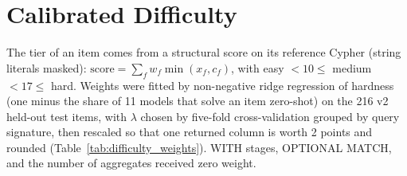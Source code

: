 \section{Calibrated Difficulty}
\label{app:difficulty}
The tier of an item comes from a structural score on its reference Cypher (string literals masked): $\mathrm{score}=\sum_f w_f \min(x_f, c_f)$, with easy $<10\le$ medium $<17\le$ hard. Weights were fitted by non-negative ridge regression of hardness (one minus the share of 11 models that solve an item zero-shot) on the 216 v2 held-out test items, with $\lambda$ chosen by five-fold cross-validation grouped by query signature, then rescaled so that one returned column is worth 2 points and rounded (Table~\ref{tab:difficulty_weights}). WITH stages, OPTIONAL MATCH, and the number of aggregates received zero weight.

\begin{table}[H]
\centering
\footnotesize
{}
\caption{Difficulty score. On the calibration items the solve rate falls from easy to medium to hard for all 11 models; of the 43 items no model solved, 24 are hard and 2 easy. The previous heuristic labeled 1 of 216 items hard.}
\label{tab:difficulty_weights}
\end{table}

